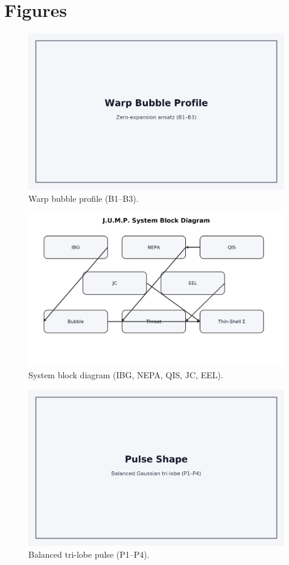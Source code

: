 \documentclass[11pt]{article}
\begin{document}
\section{Figures}
\begin{figure}[h]\centering\includegraphics[width=0.85\linewidth]{figures/bubble_profile.png}\caption{Warp bubble profile (B1--B3).}\end{figure}
\begin{figure}[h]\centering\includegraphics[width=0.85\linewidth]{figures/block_diagram.png}\caption{System block diagram (IBG, NEPA, QIS, JC, EEL).}\end{figure}
\begin{figure}[h]\centering\includegraphics[width=0.85\linewidth]{figures/pulse_shape.png}\caption{Balanced tri-lobe pulse (P1--P4).}\end{figure}
\end{document}
